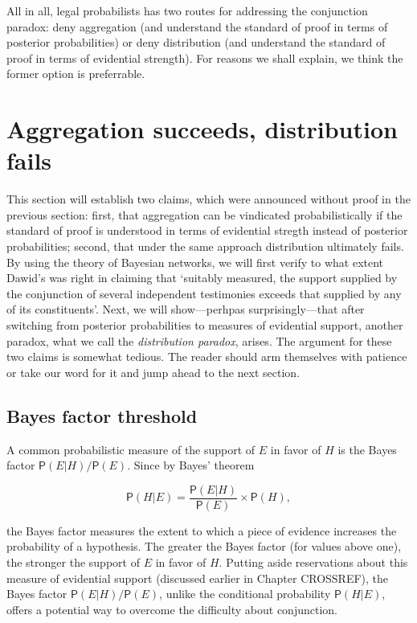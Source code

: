 \documentclass[10pt,dvipsnames,enabledeprecatedfontcommands]{scrartcl}
\newcommand{\pr}[1]{\mathsf{P}(#1)}
\begin{document}
All in all, legal probabilists has two routes for addressing the
conjunction paradox: deny aggregation (and understand the standard of
proof in terms of posterior probabilities) or deny distribution (and
understand the standard of proof in terms of evidential strength). For
reasons we shall explain, we think the former option is preferrable.

\hypertarget{aggregation-succeeds-distribution-fails}{%
\section{Aggregation succeeds, distribution
fails}\label{aggregation-succeeds-distribution-fails}}

This section will establish two claims, which were announced without
proof in the previous section: first, that aggregation can be vindicated
probabilistically if the standard of proof is understood in terms of
evidential stregth instead of posterior probabilities; second, that
under the same approach distribution ultimately fails. By using the
theory of Bayesian networks, we will first verify to what extent Dawid's
was right in claiming that `suitably measured, the support supplied by
the conjunction of several independent testimonies exceeds that supplied
by any of its constituents'. Next, we will show---perhpas
surprisingly---that after switching from posterior probabilities to
measures of evidential support, another paradox, what we call the
\textit{distribution paradox}, arises. The argument for these two claims
is somewhat tedious. The reader should arm themselves with patience or
take our word for it and jump ahead to the next section.

\hypertarget{bayes-factor-threshold}{%
\subsection{Bayes factor threshold}\label{bayes-factor-threshold}}

A common probabilistic measure of the support of \(E\) in favor of \(H\)
is the Bayes factor \(\pr{E \vert H}/\pr{E}\). Since by Bayes' theorem

\[\pr{H \vert E} = \frac{\pr{E \vert H}}{\pr{E}}\times \pr{H},\]

\noindent the Bayes factor measures the extent to which a piece of
evidence increases the probability of a hypothesis. The greater the
Bayes factor (for values above one), the stronger the support of \(E\)
in favor of \(H\). Putting aside reservations about this measure of
evidential support (discussed earlier in Chapter CROSSREF), the Bayes
factor \(\pr{E | H}/\pr{E}\), unlike the conditional probability
\(\pr{H | E}\), offers a potential way to overcome the difficulty about
conjunction.
\end{document}

